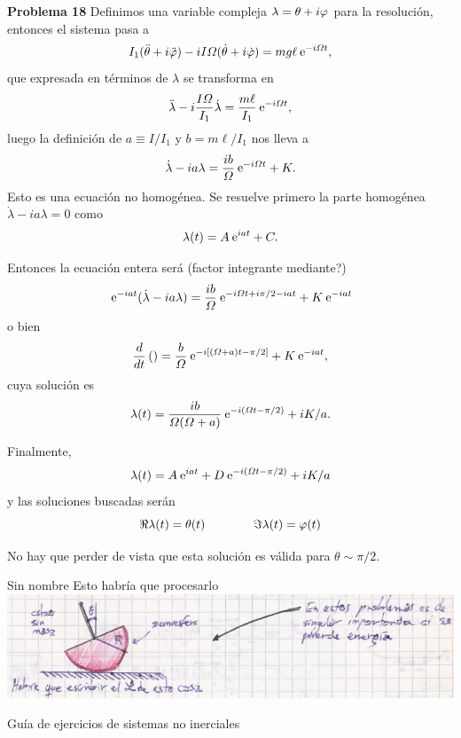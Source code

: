 \documentclass[10pt,oneside]{CBFT_book}
\begin{document}
\begin{ejemplo}{\bf Problema 18}
Definimos una variable compleja $\lambda = \theta + i \varphi $ para la resolución, entonces el sistema
pasa a 
\[
	I_1 (\ddot{\theta} + i \ddot{\varphi} ) - i I \Omega ( \dot{\theta} + i \dot{\varphi} ) = m g \ell \:\mathrm{e}^{ -i \Omega t },
\]
que expresada en términos de $\lambda$ se transforma en 
\[
	\ddot{\lambda} - i\frac{I \Omega}{I_1} \dot{\lambda} = \frac{m \ell}{I_1} \:\mathrm{e}^{-i \Omega t},
\]
luego la definición de $a \equiv I/I_1$ y $ b = m \ell / I_1 $ nos lleva a
\[
	\dot{\lambda} - i a \lambda = \frac{ib}{\Omega} \:\mathrm{e}^{-i \Omega t} + K.
\]
Esto es una ecuación no homogénea. Se resuelve primero la parte homogénea $\dot{\lambda} - ia\lambda = 0$
como 
\[
	\lambda(t) = A \:\mathrm{e}^{iat} + C.
\]

Entonces la ecuación entera será (factor integrante mediante?)
\[
	\:\mathrm{e}^{-i a t } ( \dot{\lambda} - i a \lambda ) = \frac{ib}{\Omega} \:\mathrm{e}^{-i \Omega t + i \pi/2 - i a t } + K \:\mathrm{e}^{ - i a t }
\]
o bien 
\[
	\frac{d^{\hspace{-0.05em}} {}}{d {t}^{\hspace{-0.05em}}}\left( \right) = \frac{b}{\Omega}  \:\mathrm{e}^{-i [ (\Omega + a ) t - \pi/2 ] } + K \:\mathrm{e}^{ - i a t },
\]
cuya solución es
\[
	\lambda( t ) = \frac{ib}{\Omega(\Omega+a)} \:\mathrm{e}^{-i(\Omega t - \pi/2)} + i K/a.
\]

Finalmente,
\[
	\lambda( t ) = A \:\mathrm{e}^{iat} + D \:\mathrm{e}^{-i(\Omega t - \pi/2)} + i K/a
\]
y las soluciones buscadas serán
\[
	\Re{\lambda(t)} = \theta(t) \qquad \qquad \Im{\lambda(t)} = \varphi(t)
\]

No hay que perder de vista que esta solución es válida para $\theta \sim \pi/2$.
\end{ejemplo}

\begin{ejemplo}{Sin nombre}
Esto habría que procesarlo
\includegraphics[scale=0.4]{images/fig_mc_case_trompo_deforme.jpg}
\end{ejemplo}

Guía de ejercicios de sistemas no inerciales
\end{document}
